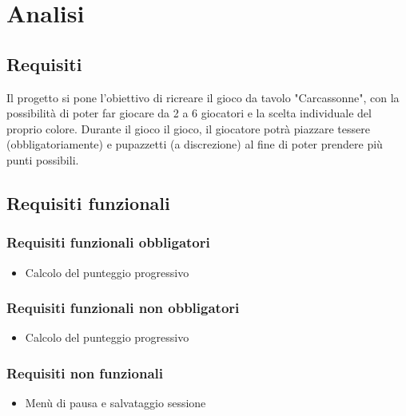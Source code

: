 \section{Analisi}
\subsection{Requisiti}
Il progetto si pone l'obiettivo di ricreare il gioco da tavolo "Carcassonne", con la possibilità di poter far giocare da 2 a 6 giocatori e la scelta individuale del proprio colore. Durante il gioco il gioco, il giocatore potrà piazzare tessere (obbligatoriamente) e pupazzetti (a discrezione) al fine di poter prendere più punti possibili. 

\subsection*{Requisiti funzionali}
\subsubsection*{Requisiti funzionali obbligatori}
\begin{itemize}
\item Calcolo del punteggio progressivo
\end{itemize}
\subsubsection*{Requisiti funzionali non obbligatori}
\begin{itemize}
\item Calcolo del punteggio progressivo
\end{itemize}

\subsubsection*{Requisiti non funzionali}
\begin{itemize}
\item Menù di pausa e salvataggio sessione
\end{itemize}

